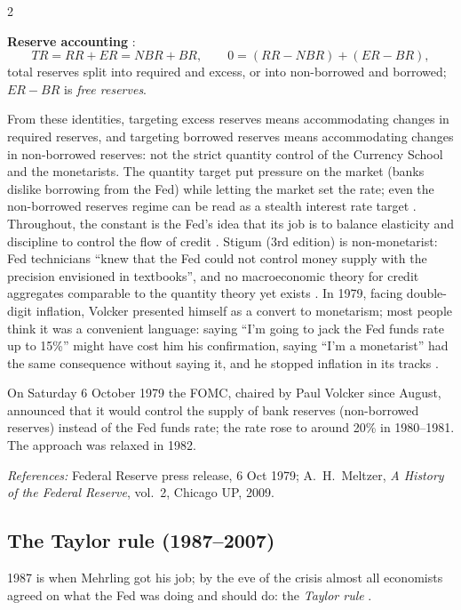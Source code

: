\begin{paracol}{2}
\begin{keyformulas}
\textbf{Reserve accounting} :
\[
  TR = RR + ER = NBR + BR, \qquad 0 = (RR - NBR) + (ER - BR),
\]
total reserves split into required and excess, or into non-borrowed and borrowed; $ER-BR$ is \emph{free reserves}.
\end{keyformulas}
From these identities, targeting excess reserves means accommodating changes in required reserves, and targeting borrowed reserves means accommodating changes in non-borrowed reserves:
not the strict quantity control of the Currency School and the monetarists. The quantity target put pressure on the market (banks dislike borrowing from the Fed) while letting the market set
the rate; even the non-borrowed reserves regime can be read as a stealth interest rate target . Throughout, the constant is the Fed's idea that its job is to balance
elasticity and discipline to control the flow of credit . Stigum (3rd edition) is non-monetarist: Fed technicians ``knew that the Fed could not control money supply with the
precision envisioned in textbooks'', and no macroeconomic theory for credit aggregates comparable to the quantity theory yet exists . In 1979, facing double-digit inflation, Volcker presented
himself as a convert to monetarism; most people think it was a convenient language: saying ``I'm going to jack the Fed funds rate up to 15\%'' might have cost him his
confirmation, saying ``I'm a monetarist'' had the same consequence without saying it, and he stopped inflation in its tracks .

\begin{history}
On Saturday 6 October 1979 the FOMC, chaired by Paul Volcker since August, announced that it would control the supply of bank reserves (non-borrowed reserves) instead of
the Fed funds rate; the rate rose to around 20\% in 1980--1981. The approach was relaxed in 1982.\par
\emph{References:} Federal Reserve press release, 6 Oct 1979; A.~H.~Meltzer, \emph{A History of the Federal Reserve}, vol.~2, Chicago UP, 2009.
\end{history}

\subsection{The Taylor rule (1987--2007)}
1987 is when Mehrling got his job; by the eve of the crisis almost all economists agreed on what the Fed was doing and should do: the \emph{Taylor rule}
.


\end{paracol}

